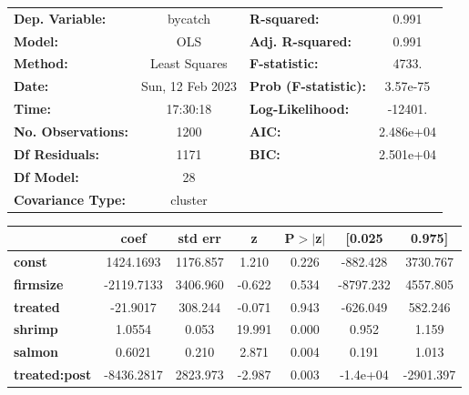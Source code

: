 \begin{center}
\begin{tabular}{lclc}
\toprule
\textbf{Dep. Variable:}    &     bycatch      & \textbf{  R-squared:         } &     0.991   \\
\textbf{Model:}            &       OLS        & \textbf{  Adj. R-squared:    } &     0.991   \\
\textbf{Method:}           &  Least Squares   & \textbf{  F-statistic:       } &     4733.   \\
\textbf{Date:}             & Sun, 12 Feb 2023 & \textbf{  Prob (F-statistic):} &  3.57e-75   \\
\textbf{Time:}             &     17:30:18     & \textbf{  Log-Likelihood:    } &   -12401.   \\
\textbf{No. Observations:} &        1200      & \textbf{  AIC:               } & 2.486e+04   \\
\textbf{Df Residuals:}     &        1171      & \textbf{  BIC:               } & 2.501e+04   \\
\textbf{Df Model:}         &          28      & \textbf{                     } &             \\
\textbf{Covariance Type:}  &     cluster      & \textbf{                     } &             \\
\bottomrule
\end{tabular}
\begin{tabular}{lcccccc}
                      & \textbf{coef} & \textbf{std err} & \textbf{z} & \textbf{P$> |$z$|$} & \textbf{[0.025} & \textbf{0.975]}  \\
\midrule
\textbf{const}        &    1424.1693  &     1176.857     &     1.210  &         0.226        &     -882.428    &     3730.767     \\
\textbf{firmsize}     &   -2119.7133  &     3406.960     &    -0.622  &         0.534        &    -8797.232    &     4557.805     \\
\textbf{treated}      &     -21.9017  &      308.244     &    -0.071  &         0.943        &     -626.049    &      582.246     \\
\textbf{shrimp}       &       1.0554  &        0.053     &    19.991  &         0.000        &        0.952    &        1.159     \\
\textbf{salmon}       &       0.6021  &        0.210     &     2.871  &         0.004        &        0.191    &        1.013     \\
\textbf{treated:post} &   -8436.2817  &     2823.973     &    -2.987  &         0.003        &     -1.4e+04    &    -2901.397     \\

\end{tabular}
\end{center}
